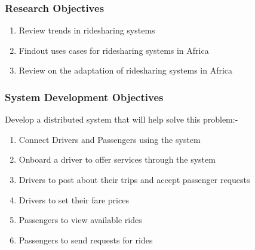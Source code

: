 \subsubsection{Research Objectives}
\begin{enumerate}
    \item Review trends in ridesharing systems
    \item Findout uses cases for ridesharing systems in Africa
    \item Review on the adaptation of ridesharing systems in Africa
\end{enumerate}

\subsubsection{System Development Objectives}
Develop a distributed system that will help solve this problem:-

\begin{enumerate}
    \item Connect Drivers and Passengers using the system
    \item Onboard a driver to offer services through the system
    \item Drivers to post about their trips and accept passenger requests
    \item Drivers to set their fare prices
    \item Passengers to view available rides
    \item Passengers to send requests for rides
\end{enumerate}
